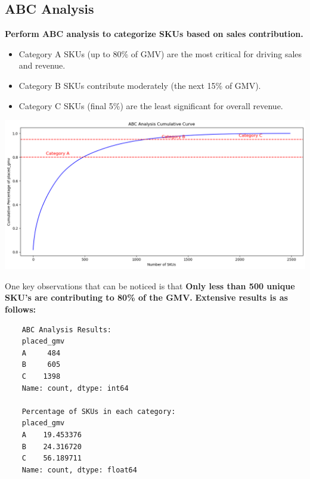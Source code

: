 \documentclass{article}
\begin{document}
    \subsection{ABC Analysis}
    \textbf{Perform ABC analysis to categorize SKUs based on sales contribution.}
    \begin{itemize}
        \item   Category A SKUs (up to 80\% of GMV) are the most critical for driving sales and revenue.
        \item Category B SKUs contribute moderately (the next 15\% of GMV).
        \item Category C SKUs (final 5\%) are the least significant for overall revenue.
    \end{itemize}
    \begin{center}
        \includegraphics[width=1\columnwidth]{images/abc.png}
    \end{center}
One key observations that can be noticed is that \textbf{Only less than 500 unique SKU's are contributing to 80\% of the GMV.}
\textbf{Extensive results is as follows:}
\begin{verbatim}
    ABC Analysis Results:
    placed_gmv
    A     484
    B     605
    C    1398
    Name: count, dtype: int64
    
    Percentage of SKUs in each category:
    placed_gmv
    A    19.453376
    B    24.316720
    C    56.189711
    Name: count, dtype: float64
\end{verbatim}


    
\end{document}
